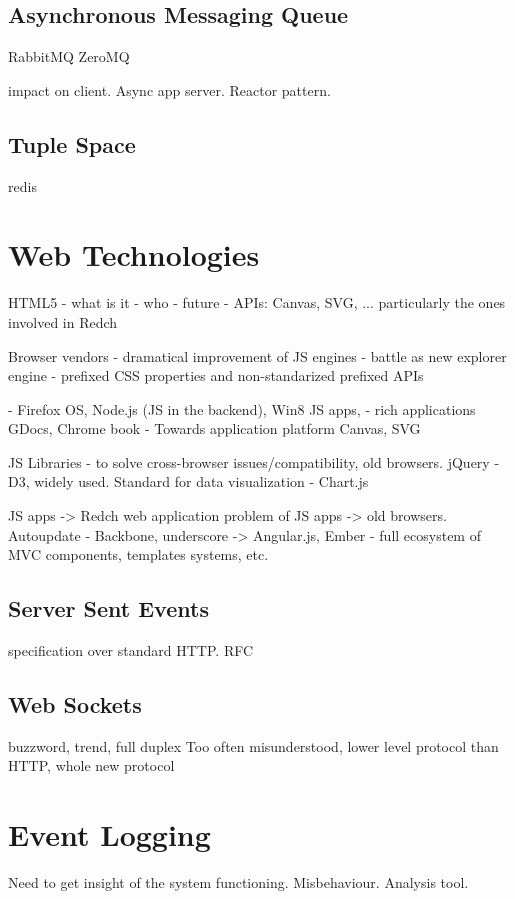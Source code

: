 \subsection{Asynchronous Messaging Queue}
RabbitMQ
ZeroMQ

impact on client. Async app server. Reactor pattern.

\subsection{Tuple Space}
redis

\section{Web Technologies}

HTML5	
	- what is it
	- who
	- future
	- APIs: Canvas, SVG, ... particularly the ones involved in Redch

Browser vendors
	- dramatical improvement of JS engines
	- battle as new explorer engine
	- prefixed CSS properties and non-standarized prefixed APIs

	- Firefox OS, Node.js (JS in the backend), Win8 JS apps, 
	- rich applications GDocs, Chrome book
	- Towards application platform
Canvas, SVG

JS Libraries
	- to solve cross-browser issues/compatibility, old browsers. jQuery
	- D3, widely used. Standard for data visualization
	- Chart.js

	JS apps -> Redch web application 
	problem of JS apps -> old browsers. Autoupdate
	- Backbone, underscore -> Angular.js, Ember
	- full ecosystem of MVC components, templates systems, etc.

\subsection{Server Sent Events}
specification over standard HTTP. RFC

\subsection{Web Sockets}
buzzword, trend, full duplex
Too often misunderstood, lower level protocol than HTTP, whole new protocol

\section{Event Logging}
Need to get insight of the system functioning. Misbehaviour. Analysis tool.